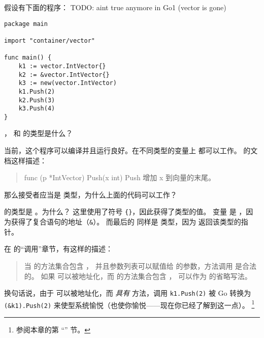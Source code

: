 \begin{Exercise}[title={方法调用},difficulty=8]
\label{ex:methodcalls}
\Question \label{ex:methodcalls q1} 假设有下面的程序：
TODO: aint true anymore in Go1 (vector is gone)
\begin{lstlisting}
package main

import "container/vector"

func main() {
	k1 := vector.IntVector{}
	k2 := &vector.IntVector{}
	k3 := new(vector.IntVector)
	k1.Push(2)
	k2.Push(3)
	k3.Push(4)
}
\end{lstlisting}
， 和  的类型是什么？

\Question 当前，这个程序可以编译并且运行良好。在不同类型的变量上 
都可以工作。 的文档这样描述：
\begin{quote}
func (p *IntVector) Push(x int)
Push 增加 x 到向量的末尾。
\end{quote}
那么接受者应当是  类型，为什么上面的代码可以工作？

\end{Exercise}

\begin{Answer}
\Question {} 的类型是 。为什么？
这里使用了符号 \verb|{}|，因此获得了类型的值。
变量  是 ，因为获得了复合语句的地址（\verb|&|）。
而最后的  同样是  类型，因为 
返回该类型的指针。

\Question 在 \cite{go_spec} 的``调用''章节，有这样的描述：
\begin{quote}
当  的方法集合包含 ，
并且参数列表可以赋值给  的参数，方法调用  是合法的。
如果  可以被地址化，而  的方法集合包含 ，
 可以作为  的省略写法。
\end{quote}
换句话说，由于  可以被地址化，而 
\emph{具有}  方法，调用 \lstinline{k1.Push(2)} 被 Go 转换为 
\lstinline{(&k1).Push(2)} 来使型系统愉悦（也使你愉悦——现在你已经了解到这一点）。
\footnote{参阅本章的第 ``'' 节。}

\end{Answer}

